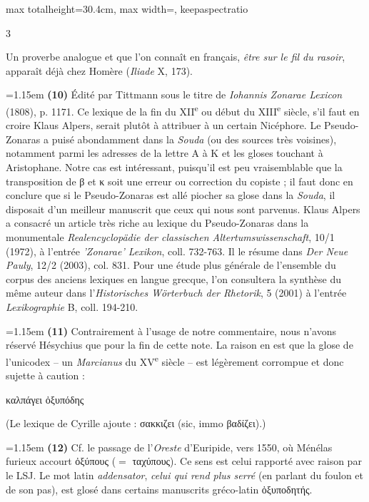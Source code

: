 \documentclass[11pt,twoside]{book}
\newcommand{\italique}[1]{\textit{#1}}
\newcommand{\citComm}[1]{\begin{quoting}[vskip=0.4pt,leftmargin=0.7em,rightmargin=0.2em]#1\end{quoting}}
\newcommand{\nieme}[1]{#1\textsuperscript{e}}
\newcommand{\LSJ}{LSJ}
\newcommand{\latin}[1]{\textit{#1}}
\newcommand{\allemand}[1]{\textit{#1}}
\begin{document}
\begin{adjustbox}{max totalheight=30.4cm, max width=\textwidth, keepaspectratio}
\begin{minipage}{\textwidth}
{\begin{multicols}{3}
\par\vspace{1.5pt}
\noindent Un proverbe analogue et que l'on connaît en français, \italique{être sur le fil du rasoir}, apparaît déjà chez Homère (\italique{Iliade} X, 173).
\par\vspace{1.5pt}
\noindent\hangindent=1.15em {\color{sepiaNote}\textbf{(10)}} Édité par Tittmann sous le titre de \italique{Iohannis Zonarae Lexicon} (1808), p. 1171. Ce lexique de la fin du \nieme{XII} ou début du \nieme{XIII} siècle, s'il faut en croire Klaus Alpers, serait plutôt à attribuer à un certain Nicéphore. Le Pseudo-Zonaras a puisé abondamment dans la \italique{Souda} (ou des sources très voisines), notamment parmi les adresses de la lettre Α à Κ et les gloses touchant à Aristophane. Notre cas est intéressant, puisqu'il est peu vraisemblable que la transposition de β et κ soit une erreur ou correction du copiste ; il faut donc en conclure que si le Pseudo-Zonaras est allé piocher sa glose dans la \italique{Souda}, il disposait d'un meilleur manuscrit que ceux qui nous sont parvenus. Klaus Alpers a consacré un article très riche au lexique du Pseudo-Zonaras dans la monumentale \italique{Realencyclopädie der classischen Altertumswissenschaft}, 10/1 (1972), à l'entrée \allemand{'Zonarae' Lexikon}, coll. 732-763. Il le résume dans \italique{Der Neue Pauly}, 12/2 (2003), col. 831. Pour une étude plus générale de l'ensemble du corpus des anciens lexiques en langue grecque, l'on consultera la synthèse du même auteur dans l'\italique{Historisches Wörterbuch der Rhetorik}, 5 (2001) à l'entrée \allemand{Lexikographie} B, coll. 194-210.
\par\vspace{1.5pt}
\noindent\hangindent=1.15em {\color{sepiaNote}\textbf{(11)}} Contrairement à l'usage de notre commentaire, nous n'avons réservé Hésychius que pour la fin de cette note. La raison en est que la glose de l'unicodex -- un \italique{Marcianus} du \nieme{XV} siècle -- est légèrement corrompue et donc sujette à caution :
\citComm{καλπάγει ὀξυπόδης}
\par\vspace{1.5pt}
\noindent (Le lexique de Cyrille ajoute : σακκιζει (sic, immo βαδίζει).)
\par\vspace{1.5pt}
\noindent\hangindent=1.15em {\color{sepiaNote}\textbf{(12)}} Cf. le passage de l'\italique{Oreste} d'Euripide, vers 1550, où Ménélas furieux accourt ὀξύπους ($=$ ταχύπους). Ce sens est celui rapporté avec raison par le \LSJ. Le mot latin \latin{addensator}, \italique{celui qui rend plus serré} (en parlant du foulon et de son pas), est glosé dans certains manuscrits gréco-latin ὀξυποδητής.

\end{multicols}}
\end{minipage}
\end{adjustbox}
\end{document}
